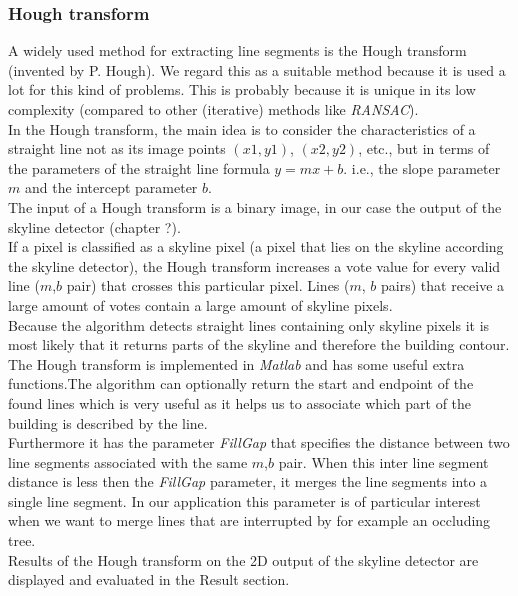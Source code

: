 \subsubsection{Hough transform}
	A widely used method for extracting line segments is the Hough transform
	(invented by P. Hough).  We regard this as a suitable method because it is
	used a lot for this kind of problems. This is probably because it is unique
	in its low complexity (compared to other (iterative) methods like
	\emph{RANSAC}).\\
	In the Hough transform, the main idea is to consider the characteristics of a
	straight line not as its image points $(x1, y1)$, $(x2, y2)$, etc., but in
	terms of the parameters of the straight line formula $y = mx + b$. i.e., the
	slope parameter $m$ and the intercept parameter $b$.\\
	The input of a Hough transform is a binary image, in our case the output of 
	the skyline detector (chapter ?).\\
	If a pixel is classified as a skyline pixel (a pixel that lies on the
	skyline according the skyline detector), the Hough transform increases
	a vote value for every valid line ($m$,$b$ pair) that crosses this
	particular pixel.  Lines ($m$, $b$ pairs) that receive a large amount of votes
	contain a large amount of skyline pixels.\\
	Because the algorithm detects straight lines containing only skyline pixels it is
	most likely that it returns parts of the skyline and therefore the building
	contour. \\ The Hough transform is implemented in \emph{Matlab} and has
	some useful extra functions.The algorithm can optionally return the start
	and endpoint of the found lines which is very useful as it helps us to
	associate which part of the building is described by the line.\\
	Furthermore it has the parameter \emph{FillGap} that specifies the distance
	between two line segments associated with the same $m$,$b$ pair.  When this
	inter line segment distance is less then the \emph{FillGap} parameter, it
	merges the line segments into a single line segment. In our application
	this parameter is of particular interest when we want to merge lines that
	are interrupted by for example an occluding tree.\\
	Results of the Hough transform on the 2D output of the skyline detector are
	displayed and evaluated in the Result section.



